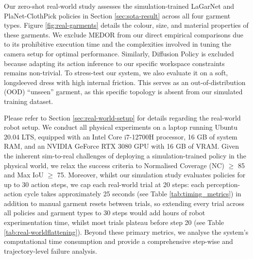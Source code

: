 \documentclass[journal]{IEEEtran}
\begin{document}
Our zero-shot real-world study assesses the simulation-trained LaGarNet and PlaNet-ClothPick policies in Section \ref{sec:sota-result}  across all four garment types. Figure \ref{fig:real-garments} details the colour, size, and material properties of these garments. We exclude MEDOR from our direct empirical comparisons due to its prohibitive execution time and the complexities involved in tuning the camera setup for optimal performance. Similarly, Diffusion Policy is excluded because adapting its action inference to our specific workspace constraints remains non-trivial. To stress-test our system, we also evaluate it on a soft, longsleeved dress with high internal friction. This serves as an out-of-distribution (OOD) ``unseen'' garment, as this specific topology is absent from our simulated training dataset. 

Please refer to Section \ref{sec:real-world-setup} for details regarding the real-world robot setup. We conduct all physical experiments on a laptop running Ubuntu 20.04 LTS, equipped with an Intel Core i7-12700H processor, 16 GB of system RAM, and an NVIDIA GeForce RTX 3080 GPU with 16 GB of VRAM. Given the inherent sim-to-real challenges of deploying a simulation-trained policy in the physical world, we relax the success criteria to Normalised Coverage (NC) $\geq$ 85 and Max IoU $\geq$ 75. Moreover, whilst our simulation study evaluates policies for up to 30 action steps, we cap each real-world trial at 20 steps: each perception-action cycle takes approximately 25 seconds (see Table \ref{tab:timing_metrics}) in addition to manual garment resets between trials, so extending every trial across all policies and garment types to 30 steps would add hours of robot experimentation time, whilst most trials plateau before step 20 (see Table \ref{tab:real-worldflattening}). Beyond these primary metrics, we analyse the system's computational time consumption and provide a comprehensive step-wise and trajectory-level failure analysis.
\end{document}
